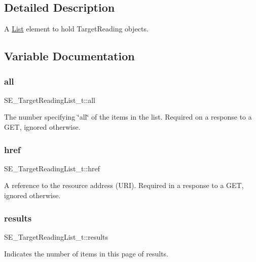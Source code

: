 \subsection{Detailed Description}
A \hyperlink{structList}{List} element to hold Target\+Reading objects. 

\subsection{Variable Documentation}
\mbox{\label{group__TargetReadingList_gab5798a709fac8c041d53520c7335bdb2}} 
\subsubsection{\texorpdfstring{all}{all}}
{\footnotesize\ttfamily S\+E\+\_\+\+Target\+Reading\+List\+\_\+t\+::all}

The number specifying \char`\"{}all\char`\"{} of the items in the list. Required on a response to a G\+ET, ignored otherwise. \mbox{\label{group__TargetReadingList_gaa952c6e2d7dea9ac53ab0c40f4658651}} 
\subsubsection{\texorpdfstring{href}{href}}
{\footnotesize\ttfamily S\+E\+\_\+\+Target\+Reading\+List\+\_\+t\+::href}

A reference to the resource address (U\+RI). Required in a response to a G\+ET, ignored otherwise. \mbox{\label{group__TargetReadingList_gae22837c348139e7dceb87e3a95152588}} 
\subsubsection{\texorpdfstring{results}{results}}
{\footnotesize\ttfamily S\+E\+\_\+\+Target\+Reading\+List\+\_\+t\+::results}

Indicates the number of items in this page of results. 